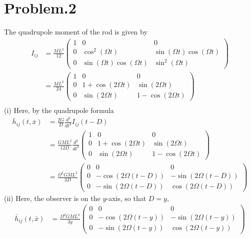 \documentclass[12pt]{article}
\begin{document}
\section*{Problem.2}
The quadrupole moment of the rod is given by
\begin{align}
I_{i j} &= \frac{M L^2}{12}
\begin{pmatrix}
1 & 0 & 0\\
0 & \cos^2\left(\Omega t\right) & \sin\left(\Omega t\right) \cos\left(\Omega t\right) \\
0 & \sin\left(\Omega t\right) \cos\left(\Omega t\right) & \sin^2\left(\Omega t\right)
\end{pmatrix}
\\
&= \frac{M L^2}{24}
\begin{pmatrix}
1 & 0 & 0\\
0 & 1 + \cos\left(2 \Omega t\right) & \sin\left(2 \Omega t\right)\\
0 & \sin\left(2 \Omega t\right) & 1 - \cos\left(2 \Omega t\right)
\end{pmatrix}
\\
\end{align}
(i) Here, by the quadrupole formula
\begin{align}
\bar{h}_{i j}(t, \bar{x}) &= \frac{2 G}{D} \frac{d^2}{dt^2} I_{i j}(t - D) \\
&= \frac{G M L^2}{12 D}
\frac{d^2}{dt^2}
\begin{pmatrix}
1 & 0 & 0\\
0 & 1 + \cos\left(2 \Omega t\right) & \sin\left(2 \Omega t\right)\\
0 & \sin\left(2 \Omega t\right) & 1 - \cos\left(2 \Omega t\right)
\end{pmatrix}
\\
&= \frac{\Omega^2 G M L^2}{3 D}
\begin{pmatrix}
0 & 0 & 0\\
0 & - \cos\left(2 \Omega (t-D)\right) & - \sin\left(2 \Omega (t-D)\right)\\
0 & - \sin\left(2 \Omega (t-D)\right) &  \cos\left(2 \Omega (t-D)\right)
\end{pmatrix}
\end{align}
(ii) Here, the observer is on the $y$-axis, so that $D = y$, 
\begin{align}
\bar{h}_{i j}(t, \bar{x}) &= \frac{\Omega^2 G M L^2}{3 y}
\begin{pmatrix}
0 & 0 & 0\\
0 & - \cos\left(2 \Omega (t-y)\right) & - \sin\left(2 \Omega (t-y)\right)\\
0 & - \sin\left(2 \Omega (t-y)\right) &  \cos\left(2 \Omega (t-y)\right)
\end{pmatrix}
\end{align}
\end{document}
